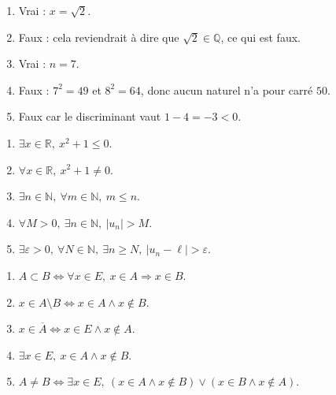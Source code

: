 \documentclass[11pt,a4paper]{article}
\newcommand{\N}{\mathbb{N}}
\newcommand{\Q}{\mathbb{Q}}
\newcommand{\R}{\mathbb{R}}
\newcommand{\et}{\wedge}
\newcommand{\ou}{\vee}
\newcommand{\imp}{\Rightarrow}
\newcommand{\ssi}{\Longleftrightarrow}
\newcommand{\eps}{\varepsilon}
\begin{document}
\begin{correctionbox}[APP 7]
\begin{enumerate}[label=\alph*)]
    \item Vrai : \(x=\sqrt2\).
    \item Faux : cela reviendrait à dire que \(\sqrt2\in\Q\), ce qui est faux.
    \item Vrai : \(n=7\).
    \item Faux : \(7^2=49\) et \(8^2=64\), donc aucun naturel n'a pour carré \(50\).
    \item Faux car le discriminant vaut \(1-4=-3<0\).
\end{enumerate}
\end{correctionbox}

\begin{correctionbox}[APP 8]
\begin{enumerate}[label=\alph*)]
    \item \(\exists x\in\R,\ x^2+1\leq0\).
    \item \(\forall x\in\R,\ x^2+1\neq0\).
    \item \(\exists n\in\N,\ \forall m\in\N,\ m\leq n\).
    \item \(\forall M>0,\ \exists n\in\N,\ |u_n|>M\).
    \item \(\exists \eps>0,\ \forall N\in\N,\ \exists n\geq N,\ |u_n-\ell|>\eps\).
\end{enumerate}
\end{correctionbox}

\begin{correctionbox}[APP 9]
\begin{enumerate}[label=\alph*)]
    \item \(A\subset B\ssi \forall x\in E,\ x\in A\imp x\in B\).
    \item \(x\in A\setminus B\ssi x\in A\et x\notin B\).
    \item \(x\in\overline A\ssi x\in E\et x\notin A\).
    \item \(\exists x\in E,\ x\in A\et x\notin B\).
    \item \(A\neq B\ssi \exists x\in E,\ (x\in A\et x\notin B)\ou(x\in B\et x\notin A)\).
\end{enumerate}
\end{correctionbox}
\end{document}
